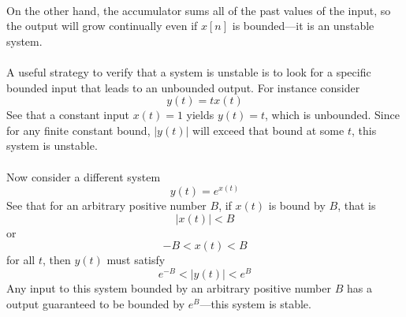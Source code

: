 \documentclass{report}
\begin{document}
\vspace{1mm}\\
On the other hand, the accumulator sums all of the past values of the input, so the output will grow continually even if $x[n]$
is bounded---it is an unstable system.\\
\vspace{1mm}\\
A useful strategy to verify that a system is unstable is to look for a specific bounded input that leads to an unbounded
output. For instance consider 
\begin{equation*}
y(t)=tx(t)
\end{equation*}
See that a constant input $x(t)=1$ yields $y(t)=t$, which is unbounded. Since for any finite constant bound, $|y(t)|$ will exceed 
that bound at some $t$, this system is unstable.\\
\vspace{1mm}\\
Now consider a different system
\begin{equation*}
y(t)=e^{x(t)}
\end{equation*}
See that for an arbitrary positive number $B$, if $x(t)$ is bound by $B$, that is
\begin{equation*}
|x(t)|<B
\end{equation*}
or
\begin{equation*}
-B<x(t)<B
\end{equation*}
for all $t$, then $y(t)$ must satisfy
\begin{equation*}
e^{-B}<|y(t)|<e^B
\end{equation*}
Any input to this system bounded by an arbitrary positive number $B$ has a output guaranteed to be bounded by $e^B$---this system
is stable.
\newpage
\end{document}
